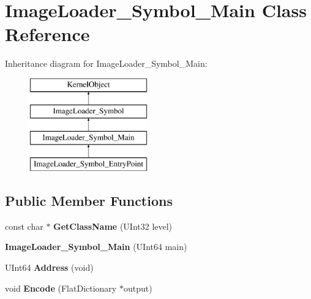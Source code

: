 \hypertarget{class_image_loader___symbol___main}{}\section{Image\+Loader\+\_\+\+Symbol\+\_\+\+Main Class Reference}
\label{class_image_loader___symbol___main}
Inheritance diagram for Image\+Loader\+\_\+\+Symbol\+\_\+\+Main\+:\begin{figure}[H]
\begin{center}
\leavevmode
\includegraphics[height=4.000000cm]{class_image_loader___symbol___main}
\end{center}
\end{figure}
\subsection*{Public Member Functions}
\begin{DoxyCompactItemize}
\item 
\mbox{\label{class_image_loader___symbol___main_a15ff87a18a8f0a877c46d8c93aa09ac5}} 
const char $\ast$ {\bfseries Get\+Class\+Name} (U\+Int32 level)
\item 
\mbox{\label{class_image_loader___symbol___main_a6bcabf879b16c29de14b618fb47a53ed}} 
{\bfseries Image\+Loader\+\_\+\+Symbol\+\_\+\+Main} (U\+Int64 main)
\item 
\mbox{\label{class_image_loader___symbol___main_ae7161c654c87b705bdecc2d9aa5953d6}} 
U\+Int64 {\bfseries Address} (void)
\item 
\mbox{\label{class_image_loader___symbol___main_a4fb54a0fe8904ed2a32a7970dfe9dfef}} 
void {\bfseries Encode} (Flat\+Dictionary $\ast$output)
\end{DoxyCompactItemize}
